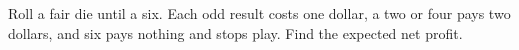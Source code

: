 Roll a fair die until a six. Each odd result costs one dollar, a two or four pays two dollars, and six pays nothing and stops play. Find the expected net profit.
